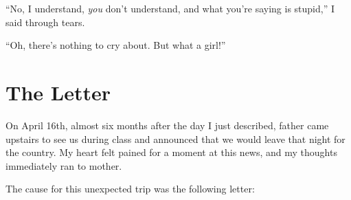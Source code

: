 ``No, I understand, \emph{you} don't understand, and what you're saying is stupid,'' I said through tears. %

``Oh, there's nothing to cry about. But what a girl!'' %

\chapter{The Letter} %

On April 16th, almost six months after the day I just described, father came upstairs to see us during class and announced that we would leave that night for the country. My heart felt pained for a moment at this news, and my thoughts immediately ran to mother.

The cause for this unexpected trip was the following letter:

